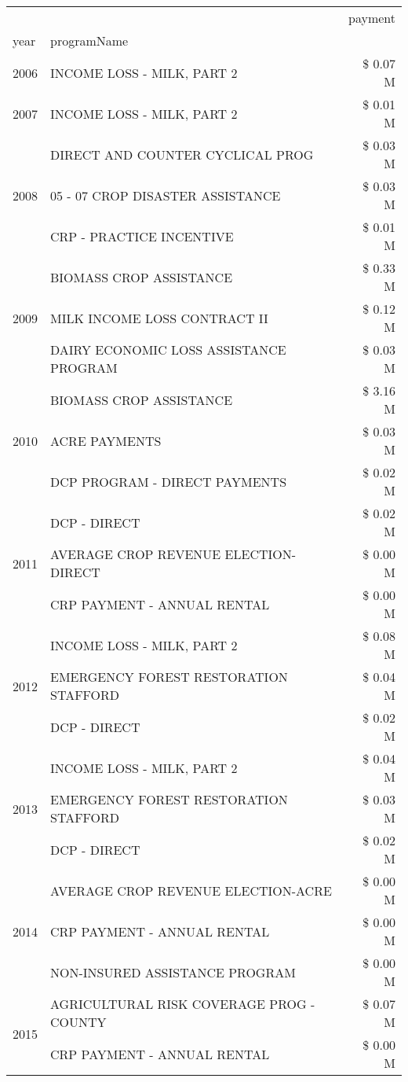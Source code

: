 \begin{tabular}{llr}
\toprule
 &  & payment \\
year & programName &  \\
\midrule
2006 & INCOME LOSS - MILK, PART 2 & \$ 0.07 M \\
\cline{1-3}
2007 & INCOME LOSS - MILK, PART 2 & \$ 0.01 M \\
\cline{1-3}
\multirow[t]{3}{*}{2008} & DIRECT AND COUNTER CYCLICAL PROG & \$ 0.03 M \\
 & 05 - 07 CROP DISASTER ASSISTANCE & \$ 0.03 M \\
 & CRP - PRACTICE INCENTIVE & \$ 0.01 M \\
\cline{1-3}
\multirow[t]{3}{*}{2009} & BIOMASS CROP ASSISTANCE & \$ 0.33 M \\
 & MILK INCOME LOSS CONTRACT II & \$ 0.12 M \\
 & DAIRY ECONOMIC LOSS ASSISTANCE PROGRAM & \$ 0.03 M \\
\cline{1-3}
\multirow[t]{3}{*}{2010} & BIOMASS CROP ASSISTANCE & \$ 3.16 M \\
 & ACRE PAYMENTS & \$ 0.03 M \\
 & DCP PROGRAM - DIRECT PAYMENTS & \$ 0.02 M \\
\cline{1-3}
\multirow[t]{3}{*}{2011} & DCP - DIRECT & \$ 0.02 M \\
 & AVERAGE CROP REVENUE ELECTION-DIRECT & \$ 0.00 M \\
 & CRP PAYMENT - ANNUAL RENTAL & \$ 0.00 M \\
\cline{1-3}
\multirow[t]{3}{*}{2012} & INCOME LOSS - MILK, PART 2 & \$ 0.08 M \\
 & EMERGENCY FOREST RESTORATION STAFFORD & \$ 0.04 M \\
 & DCP - DIRECT & \$ 0.02 M \\
\cline{1-3}
\multirow[t]{3}{*}{2013} & INCOME LOSS - MILK, PART 2 & \$ 0.04 M \\
 & EMERGENCY FOREST RESTORATION STAFFORD & \$ 0.03 M \\
 & DCP - DIRECT & \$ 0.02 M \\
\cline{1-3}
\multirow[t]{3}{*}{2014} & AVERAGE CROP REVENUE ELECTION-ACRE & \$ 0.00 M \\
 & CRP PAYMENT - ANNUAL RENTAL & \$ 0.00 M \\
 & NON-INSURED ASSISTANCE PROGRAM & \$ 0.00 M \\
\cline{1-3}
\multirow[t]{3}{*}{2015} & AGRICULTURAL RISK COVERAGE PROG - COUNTY & \$ 0.07 M \\
 & CRP PAYMENT - ANNUAL RENTAL & \$ 0.00 M \\

\end{tabular}
